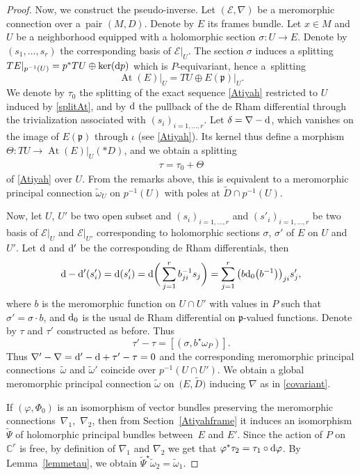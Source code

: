 \documentclass[10pt,a4paper]{amsart}
\numberwithin{equation}{section}
\begin{document}
\begin{proof}
 Now, we construct the pseudo-inverse. Let $(\mathcal{E},\nabla)$ be a meromorphic connection over a~pair $(M,D)$. Denote by $E$ its frames bundle. Let $x\in M$ and $U$ be a neighborhood equipped with a holomorphic section $\sigma\colon U \longrightarrow E$. Denote by $(s_1,\dots,s_r)$ the corresponding basis of $\mathcal{E}\vert_U$. The section $\sigma$ induces a splitting $TE\vert_{p^{-1}(U)} = p^* TU \oplus \ker({\rm d}p)$ which is $P$-equivariant, hence a~splitting
 \begin{equation}\label{splitAt} \operatorname{At}(E)\vert_U = TU \oplus E(\mathfrak{p})\vert_U.
 \end{equation}
 We denote by $\tau_0$ the splitting of the exact sequence \eqref{Atiyah} restricted to $U$ induced by \eqref{splitAt}, and by ${\rm d}$ the pullback of the de Rham differential through the trivialization associated with $(s_i)_{i=1,\dots,r}$. Let $\delta = \nabla-{\rm d}$, which vanishes on the image of $E(\mathfrak{p})$ through $\iota$ (see \eqref{Atiyah}). Its kernel thus define a morphism $\Theta\colon TU \longrightarrow \operatorname{At}(E)\vert_U(* D)$, and we obtain a splitting
 \begin{gather*}%
 \tau= \tau_0 +\Theta
 \end{gather*}
 of \eqref{Atiyah} over $U$. From the remarks above, this is equivalent to a meromorphic principal connection $\tilde{\omega}_U$ on $p^{-1}(U)$ with poles at $\tilde{D}\cap p^{-1}(U)$.

 Now, let $U$, $U'$ be two open subset and $(s_i)_{i=1,\dots,r}$ and $(s'_i)_{i=1,\dots,r}$ be two basis of $\mathcal{E}\vert_U$ and $\mathcal{E}\vert_{U'}$ corresponding to holomorphic sections $\sigma$, $\sigma'$ of $E$ on $U$ and $U'$. Let ${\rm d}$ and ${\rm d}'$ be the corresponding de Rham differentials, then
 \begin{gather*}
 {\rm d}-{\rm d}'(s'_i) = {\rm d}(s'_i) = {\rm d}\bigg(\sum_{j=1}^{r} b^{-1}_{ji} s_j\bigg) = \sum_{j=1}^{r}\big(b{\rm d}_0\big(b^{-1}\big)\big)_{ji} s'_j,
 \end{gather*}
 where $b$ is the meromorphic function on $U\cap U'$ with values in $P$ such that $\sigma' = \sigma \cdot b$, and ${\rm d}_0$ is the usual de Rham differential on $\mathfrak{p}$-valued functions. Denote by $\tau$ and $\tau'$ constructed as before. Thus
\[
 \tau'-\tau= [(\sigma,b^\star \omega_P)].\]
 Thus $\nabla'-\nabla = {\rm d}'-{\rm d} + \tau'-\tau =0$ and the corresponding meromorphic principal connections~$\tilde{\omega}$ and $\tilde{\omega}'$ coincide over $p^{-1}(U\cap U')$. We obtain a global meromorphic principal connection $\tilde{\omega}$ on~$\big(E,\tilde{D}\big)$ inducing $\nabla$ as in \eqref{covariant}.

 If $(\varphi,\Phi_0)$ is an isomorphism of vector bundles preserving the meromorphic connections~$\nabla_1$,~$\nabla_2$, then from Section~\ref{Atiyahframe} it induces an isomorphism $\tilde{\Psi}$ of holomorphic principal bundles between~$E$ and $E'$. Since the action of $P$ on $\mathbb{C}^r$ is free, by definition of $\nabla_1$ and $\nabla_2$ we get that $\varphi^*\tau_2 = \tau_1 \circ {\rm d}\varphi$. By Lemma~\ref{lemmetau}, we obtain $\tilde{\Psi}^\star \tilde{\omega}_2 = \tilde{\omega}_1$.
\end{proof}
\end{document}
